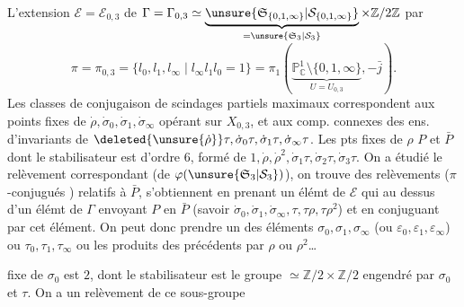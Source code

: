L'extension $\mathcal E=\mathcal E_{0,3}$ de $\Gamma=\Gamma_{0,3}\simeq\underbrace{\unsure{\mathfrak S_{\{0,1,\infty\}}|\mathcal S_{\{0,1,\infty\}}}}_{=\unsure{\mathfrak S_3|\mathcal S_3}}\times\mathbb Z/2\mathbb Z$
par
\[
\pi=\pi_{0,3}=\{l_0,l_1,l_\infty\mid l_\infty l_1l_0=1\}=\pi_1(\underbrace{\mathbb P^1_{\mathbb C}\setminus\{0,1,\infty\}}_{U=U_{0,3}},-\bar j).
\]
Les classes de conjugaison  de scindages partiels maximaux correspondent aux points fixes de $\dot\rho,\dot\sigma_0,\dot\sigma_1,\dot\sigma_\infty$ opérant sur $X_{0,3}$, et  aux comp. connexes des ens. d'invariants de $\deleted{\unsure{\dot\rho}}\tau,\dot\sigma_0\tau,\dot\sigma_1\tau,\dot\sigma_\infty\tau$. Les pts fixes de $\rho$  $P$ et $\bar P$ dont le stabilisateur est d'ordre $6$,  formé de $1,\dot\rho,\dot\rho^2,\dot\sigma_1\tau,\dot\sigma_2\tau,\dot\sigma_3\tau$. On a étudié le relèvement correspondant  (de $\varphi(\unsure{\mathfrak S_3|\mathcal S_3})$), on trouve des relèvements ($\pi$-conjugués ) relatifs à $\bar P$, s'obtiennent en  prenant un élémt de $\mathcal E$  qui  au dessus d'un élémt de $\Gamma$ envoyant $P$ en $\bar P$ (savoir $\dot\sigma_0,\dot\sigma_1,\dot\sigma_\infty,\tau,\tau\rho,\tau\rho^2$) et en conjuguant par cet élément. On peut donc prendre  un des éléments $\sigma_0,\sigma_1,\sigma_\infty$ (ou $\varepsilon_0,\varepsilon_1,\varepsilon_\infty$) ou $\tau_0,\tau_1,\tau_\infty$ ou les produits des précédents par \deleted{\unsure{$\tau$}} $\rho$ ou $\rho^2$\ldots

   fixe de $\sigma_0$ est $2$, dont le stabilisateur est le groupe $\simeq\mathbb Z/2\times\mathbb Z/2$ engendré par $\sigma_0$ et $\tau$. On a un relèvement de ce sous-groupe
